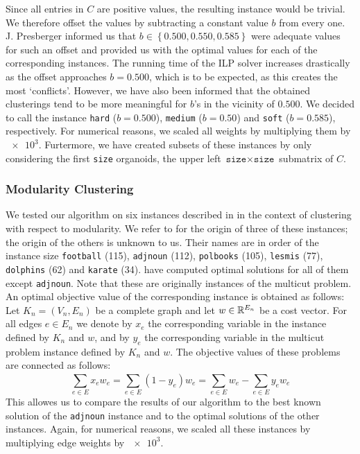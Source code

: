 Since all entries in $C$ are positive values, the resulting \CP instance would be trivial.
We therefore offset the values by subtracting a constant value $b$ from every one.
J. Presberger informed us that $b \in \left\{ 0.500, 0.550, 0.585 \right\}$ were adequate values for such an offset and provided us with the optimal values for each of the corresponding instances.
The running time of the ILP solver increases drastically as the offset approaches $b = 0.500$, which is to be expected, as this creates the most ‘conflicts’.
However, we have also been informed that the obtained clusterings tend to be more meaningful for $b$’s in the vicinity of $0.500$.
We decided to call the instance \texttt{hard} ($b= 0.500$), \texttt{medium} ($b = 0.50$) and \texttt{soft} ($b = 0.585$), respectively.
For numerical reasons, we scaled all weights by multiplying them by $\num{e3}$.
Furtermore, we have created subsets of these instances by only considering the first \texttt{size} organoids, \ie the upper left $\texttt{size} \times \texttt{size}$ submatrix of $C$.

\subsubsection{Modularity Clustering}
We tested our algorithm on six instances described in \cite{kappesComparativeStudyModern2015} in the context of clustering with respect to modularity.
We refer to \cite{brandesModularityClustering2008} for the origin of three of these instances; the origin of the others is unknown to us.
Their names are in order of the instance size \texttt{football} (115), \texttt{adjnoun} (112), \texttt{polbooks} (105), \texttt{lesmis} (77), \texttt{dolphins} (62) and \texttt{karate} (34).
\cite{kappesComparativeStudyModern2015} have computed optimal solutions for all of them except \texttt{adjnoun}.
Note that these are originally instances of the multicut problem.
An optimal objective value of the corresponding \CP instance is obtained as follows:
Let $K_{n} = (V_{n}, E_{n})$ be a complete graph and let $w \in \mathbb{R}^{E_{n}}$ be a cost vector.
For all edges $e \in E_{n}$ we denote by $x_{e}$ the corresponding variable in the \CP instance defined by $K_{n}$ and $w$, and by $y_{e}$ the corresponding variable in the multicut problem instance defined by $K_{n}$ and $w$.
The objective values of these problems are connected as follows:
\[
	\sum_{e \in E} x_{e} w_{e} = \sum_{e \in E}^{} (1-y_{e}) w_{e} = \sum_{e \in E}^{} w_{e} - \sum_{e \in E}^{} y_{e} w_{e}
\]
This allowes us to compare the results of our algorithm to the best known solution of the \texttt{adjnoun} instance and to the optimal solutions of the other instances. 
Again, for numerical reasons, we scaled all these instances by multiplying edge weights by $\num{e3}$.

